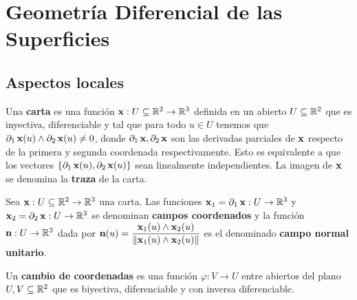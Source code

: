 \chapter{Geometría Diferencial de las Superficies}

\section{Aspectos locales}

\begin{defn}
Una \textbf{carta} es una función $\operatorname{\mathbf{x}}:U\subseteq\mathbb{R}^2\to\mathbb{R}^3$ definida en un abierto $U\subseteq \mathbb{R}^2$ que es inyectiva, diferenciable y tal que para todo $u\in U$ tenemos que $\partial_1 \operatorname{\mathbf{x}}(u)\wedge \partial_2 \operatorname{\mathbf{x}}(u) \neq 0$, donde $\partial_1 \operatorname{\mathbf{x}},\partial_2 \operatorname{\mathbf{x}}$ son las derivadas parciales de $\operatorname{\mathbf{x}}$ respecto de la primera y segunda coordenada respectivamente. Esto es equivalente a que los vectores $\{\partial_1 \operatorname{\mathbf{x}}(u),\partial_2 \operatorname{\mathbf{x}}(u)\}$ sean linealmente independientes. La imagen de $\operatorname{\mathbf{x}}$ se denomina la \textbf{traza} de la carta.
\end{defn}

\begin{defn}
Sea $\operatorname{\mathbf{x}}:U\subseteq\mathbb{R}^2\to\mathbb{R}^3$ una carta. Las funciones $\operatorname{\mathbf{x}}_1=\partial_1 \operatorname{\mathbf{x}}:U\to\mathbb{R}^3$ y $\operatorname{\mathbf{x}}_2=\partial_2\operatorname{\mathbf{x}}:U\to\mathbb{R}^3$ se denominan \textbf{campos coordenados} y la función $\operatorname{\mathbf{n}}:U\to\mathbb{R}^3$ dada por $\operatorname{\mathbf{n}}(u)=\dfrac{\operatorname{\mathbf{x}}_1(u)\wedge \operatorname{\mathbf{x}}_2(u)}{\left\| \operatorname{\mathbf{x}}_1(u)\wedge \operatorname{\mathbf{x}}_2(u) \right\|}$ es el denominado \textbf{campo normal unitario}.
\end{defn}

\begin{defn}
Un \textbf{cambio de coordenadas} es una función $\varphi:V\to U$ entre abiertos del plano $U,V\subseteq\mathbb{R}^2$ que es biyectiva, diferenciable y con inversa diferenciable.
\end{defn}

